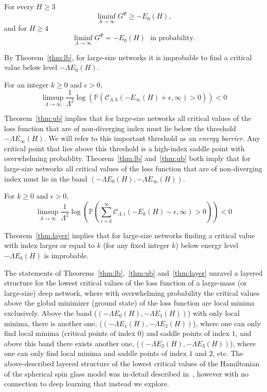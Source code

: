 \documentclass[twoside]{article}
\begin{document}
\begin{theorem}
For every $H \geq 3$
\[\liminf_{\Lambda \rightarrow \infty} G^\Psi \geq -E_0(H),
\]
and for $H \geq 4$
\[\liminf_{\Lambda \rightarrow \infty} G^\Psi = -E_0(H) \:\:\:\text{in probability.}
\]
\label{thm:lb}
\end{theorem}
By Theorem~\ref{thm:lb}, for large-size networks it is improbable to find a critical value below level $-\Lambda E_0(H)$.
\begin{theorem}
For an integer $k \geq 0$ and $\epsilon > 0$,
\[\limsup_{\Lambda \rightarrow \infty} \frac{1}{\Lambda^2}\log(\mathbb{P}(\mathcal{C}_{\Lambda,k}(-E_{\infty}(H) + \epsilon,\infty)>0)) < 0
\]
\label{thm:ub}
\end{theorem}
Theorem~\ref{thm:ub} implies that for large-size networks all critical values of the loss function that are of non-diverging index must lie below the threshold $-\Lambda E_{\infty}(H)$. We will refer to this important threshold as an \textit{energy barrier}. Any critical point that lies above this threshold is a high-index saddle point with overwhelming probablity. Theorem~\ref{thm:lb} and~\ref{thm:ub} both imply that for large-size networks all critical values of the loss function that are of non-diverging index must lie in the band $\left(-\Lambda E_0(H),-\Lambda E_{\infty}(H)\right)$.
\begin{theorem}
For $k \geq 0$ and $\epsilon > 0$,
\[\limsup_{\Lambda \rightarrow \infty} \frac{1}{\Lambda^2}\log(\mathbb{P}(\sum_{i=k}^{\infty}\!\mathcal{C}_{\Lambda,i}(-E_k(H) - \epsilon,\infty) \!>\! 0)) \!<\! 0
\]
\label{thm:layer}
\end{theorem}
Theorem~\ref{thm:layer} implies that for large-size networks finding a critical value with index larger or equal to $k$ (for any fixed integer $k$) below energy level $-\Lambda E_k(H)$ is improbable. 

The statements of Theorems~\ref{thm:lb},~\ref{thm:ub} and~\ref{thm:layer} unravel a layered structure for the lowest critical values of the loss function of a large-mass (or large-size) deep network, where with overwhelming probability the critical values above the global minimizer (ground state) of the loss function are local minima exclusively. Above the band ($\left(-\Lambda E_0(H),-\Lambda E_1(H)\right)$) with only local minima, there is another one, ($\left(-\Lambda E_1(H),-\Lambda E_2(H)\right)$), where one can only find local minima (critical points of index $0$) and saddle points of index $1$, and above this band there exists another one, ($\left(-\Lambda E_2(H),-\Lambda E_3(H)\right)$), where one can only find local minima and saddle points of index $1$ and $2$, etc. The above-described layered structure of the lowest critical values of the Hamiltonian of the spherical spin glass model was in-detail described in~\cite{AAC2010}, however with no connection to deep learning that instead we explore. 
\end{document}
